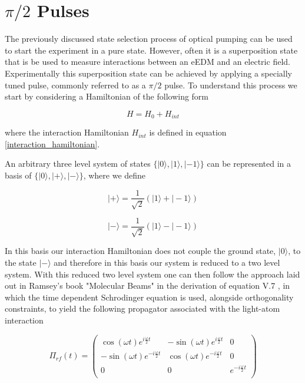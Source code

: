 \section{\texorpdfstring{$\pi/2$}{pi/2} Pulses}
\label{pi_pulses}

The previously discussed state selection process of optical pumping can be used to start the experiment in a pure state. However, often it is a superposition state that is be used to measure interactions between an eEDM and an electric field. Experimentally this superposition state can be achieved by applying a specially tuned pulse, commonly referred to as a $\pi/2$ pulse. To understand this process we start by considering a Hamiltonian of the following form

\begin{equation}
    H = H_0 + H_{int}
\end{equation}

where the interaction Hamiltonian $H_{int}$ is defined in equation \ref{interaction_hamiltonian}.

An arbitrary three level system of states $\{| 0 \rangle, | 1 \rangle, | -1 \rangle\}$ can be represented in a basis of $\{| 0 \rangle, | + \rangle, | - \rangle\}$, where we define

\begin{equation}
    | + \rangle = \frac{1}{\sqrt{2}} ( | 1 \rangle + | - 1 \rangle )
\end{equation}

\begin{equation}
    | - \rangle = \frac{1}{\sqrt{2}} ( | 1 \rangle - | - 1 \rangle )
\end{equation}

In this basis our interaction Hamiltonian does not couple the ground state, $| 0 \rangle$, to the state $| - \rangle$ and therefore in this basis our system is reduced to a two level system. With this reduced two level system one can then follow the approach laid out in Ramsey's book "Molecular Beams" in the derivation of equation V.7 \cite{Ramsey_1956}, in which the time dependent Schrodinger equation is used, alongside orthogonality constraints, to yield the following propagator associated with the light-atom interaction

\begin{equation}
    \label{pulse_propagator}
    \Pi_{rf}(t) = \begin{pmatrix}
        \cos(\omega t) e^{i \frac{\omega}{2} t} & - \sin(\omega t) e^{i \frac{\omega}{2} t} & 0 \\
        - \sin(\omega t) e^{-i \frac{\omega}{2} t} & \cos(\omega t) e^{-i \frac{\omega}{2} t} & 0 \\
         0 & 0 & e^{-i \frac{\omega}{2} t} \\
    \end{pmatrix}
\end{equation}

